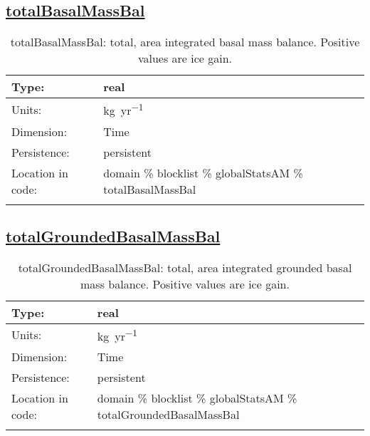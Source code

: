 \subsection[totalBasalMassBal]{\hyperref[sec:var_tab_globalStatsAM]{totalBasalMassBal}}
\label{subsec:var_sec_globalStatsAM_totalBasalMassBal}
\begin{center}
\begin{longtable}{| p{2.0in} | p{4.0in} |}
        \hline 
        Type: & real \\
        \hline 
        Units: & \si{kg.yr^{-1}} \\
        \hline 
        Dimension: & Time \\
        \hline 
        Persistence: & persistent \\
        \hline 
         Location in code: & domain \% blocklist \% globalStatsAM \% totalBasalMassBal \\
         \hline 
    \caption{totalBasalMassBal: total, area integrated basal mass balance. Positive values are ice gain.}
\end{longtable}
\end{center}
\subsection[totalGroundedBasalMassBal]{\hyperref[sec:var_tab_globalStatsAM]{totalGroundedBasalMassBal}}
\label{subsec:var_sec_globalStatsAM_totalGroundedBasalMassBal}
\begin{center}
\begin{longtable}{| p{2.0in} | p{4.0in} |}
        \hline 
        Type: & real \\
        \hline 
        Units: & \si{kg.yr^{-1}} \\
        \hline 
        Dimension: & Time \\
        \hline 
        Persistence: & persistent \\
        \hline 
         Location in code: & domain \% blocklist \% globalStatsAM \% totalGroundedBasalMassBal \\
         \hline 
    \caption{totalGroundedBasalMassBal: total, area integrated grounded basal mass balance. Positive values are ice gain.}
\end{longtable}
\end{center}
